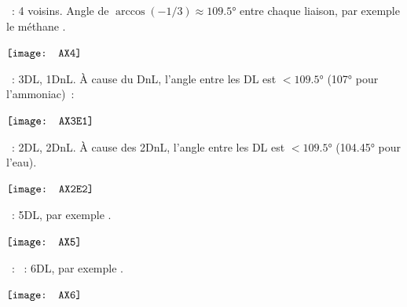 \documentclass[../main/main.tex]{subfiles}
\begin{document}
\begin{itemize}[label=$\diamond$]
     ~: 4 voisins. Angle de
        $\arccos(-1/3)\approx\ang{109.5}$ entre chaque liaison, par exemple le
        méthane .
        \begin{center}
            \hfill
            $\vcenter{\hbox{\texttt{[image: AX4]}}}$
            \hfill
            \hfill~
        \end{center}
     ~: 3DL, 1DnL. À cause du DnL, l'angle
        entre les DL est $<\ang{109.5}$ (\ang{107} pour l'ammoniac)~:
        \begin{center}
            \hfill
            $\vcenter{\hbox{\texttt{[image: AX3E1]}}}$
            \hfill
            \hfill~
        \end{center}
     ~: 2DL, 2DnL. À cause des 2DnL, l'angle entre les DL
        est $<\ang{109.5}$ (\ang{104.45} pour l'eau).
        \begin{center}
            \hfill
            $\vcenter{\hbox{\texttt{[image: AX2E2]}}}$
            \hfill
            \hfill~
        \end{center}
     ~: 5DL, par exemple .
        \begin{center}
            \hfill
            $\vcenter{\hbox{\texttt{[image: AX5]}}}$
            \hfill
            \hfill~
        \end{center}
    ~: ~: 6DL, par exemple .
        \begin{center}
            \hfill
            $\vcenter{\hbox{\texttt{[image: AX6]}}}$
            \hfill
            \hfill~
        \end{center}
\end{itemize}
\end{document}
